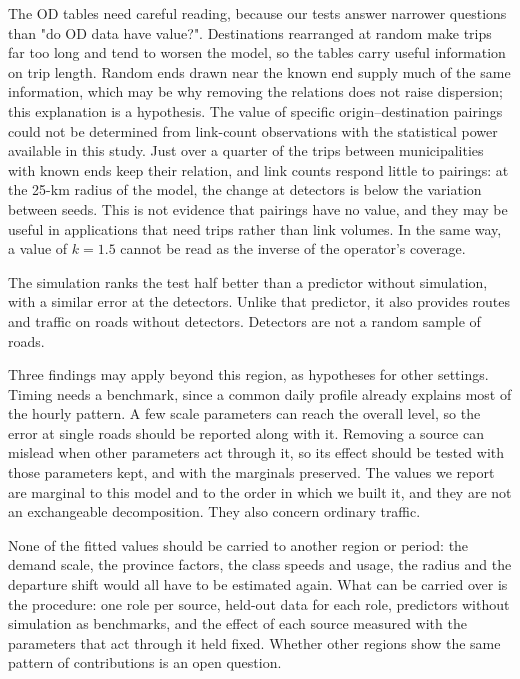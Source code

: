 \documentclass[preprint,11pt,a4paper]{elsarticle}
\begin{document}
The OD tables need careful reading, because our tests answer narrower questions than "do OD data have value?". Destinations rearranged at random make trips far too long and tend to worsen the model, so the tables carry useful information on trip length. Random ends drawn near the known end supply much of the same information, which may be why removing the relations does not raise dispersion; this explanation is a hypothesis. The value of specific origin--destination pairings could not be determined from link-count observations with the statistical power available in this study. Just over a quarter of the trips between municipalities with known ends keep their relation, and link counts respond little to pairings: at the 25-km radius of the model, the change at detectors is below the variation between seeds. This is not evidence that pairings have no value, and they may be useful in applications that need trips rather than link volumes. In the same way, a value of $k=1.5$ cannot be read as the inverse of the operator's coverage.

The simulation ranks the test half better than a predictor without simulation, with a similar error at the detectors. Unlike that predictor, it also provides routes and traffic on roads without detectors. Detectors are not a random sample of roads.

Three findings may apply beyond this region, as hypotheses for other settings. Timing needs a benchmark, since a common daily profile already explains most of the hourly pattern. A few scale parameters can reach the overall level, so the error at single roads should be reported along with it. Removing a source can mislead when other parameters act through it, so its effect should be tested with those parameters kept, and with the marginals preserved. The values we report are marginal to this model and to the order in which we built it, and they are not an exchangeable decomposition. They also concern ordinary traffic.

None of the fitted values should be carried to another region or period: the demand scale, the province factors, the class speeds and usage, the radius and the departure shift would all have to be estimated again. What can be carried over is the procedure: one role per source, held-out data for each role, predictors without simulation as benchmarks, and the effect of each source measured with the parameters that act through it held fixed. Whether other regions show the same pattern of contributions is an open question.
\end{document}
